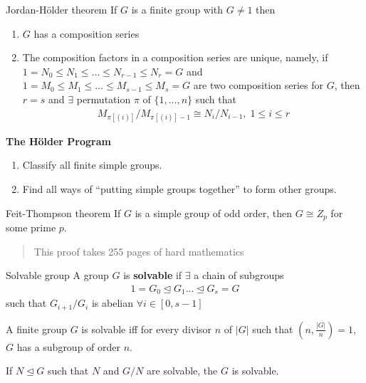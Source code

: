 \documentclass[titlepage, 12pt]{article}
\begin{document}
\begin{theorem}{Jordan-H\"older theorem}{}
    If $G$ is a finite group with $G\neq 1$ then
    \begin{enumerate}
        \item $G$ has a composition series
        \item The composition factors in a composition series are unique,
            namely, if $1 = N_0\le N_1\le\dots\le N_{r-1}\le N_r = G$ and $1 =
            M_0\le M_1\le\dots\le M_{s-1}\le M_s = G$ are two composition series
            for $G$, then $r = s$ and $\exists$ permutation $\pi$ of
            $\{1,\dots,n\}$ such that
            \begin{gather*}
                M_{\pi[(i)]}/M_{\pi[(i)] - 1}\cong N_i/N_{i - 1},\; 1\le i\le r
            \end{gather*}
    \end{enumerate}
\end{theorem}
\begin{center}
    \large{\textbf{The H\"older Program}}
    \begin{enumerate}
        \item Classify all finite simple groups.
        \item Find all ways of ``putting simple groups together'' to form other
            groups.
    \end{enumerate}
\end{center}
\begin{theorem}{Feit-Thompson theorem}{}
    If $G$ is a simple group of odd order, then $G\cong Z_p$ for some prime
    $p$.
\end{theorem}
\begin{quotation}
This proof takes 255 pages of hard mathematics
\end{quotation}
\begin{definition}{Solvable group}{}
    A group $G$ is \textbf{solvable} if $\exists$ a chain of subgroups
    \begin{gather*}
        1 = G_0\trianglelefteq G_1\dots\trianglelefteq G_s = G
    \end{gather*}
    such that $G_{i+1}/G_i$ is abelian $\forall i\in[0, s - 1]$
\end{definition}
\begin{theorem}{}{}
    A finite group $G$ is solvable iff for every divisor $n$ of $|G|$ such that
    $(n, \frac{|G|}{n}) = 1$, $G$ has a subgroup of order $n$.
\end{theorem}
\begin{proposition}{}{}
    If $N\trianglelefteq G$ such that $N$ and $G/N$ are solvable, the $G$ is
    solvable.
\end{proposition}
\end{document}
